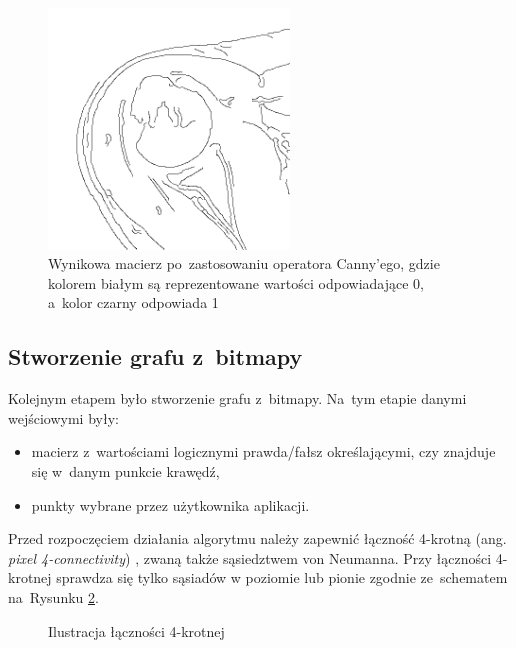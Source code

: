 \documentclass[a4paper,11pt,twoside,openright]{report}
\theoremstyle{definition}
\begin{document}
\begin{figure}[h!]
	\center
	\includegraphics[width=0.57\textwidth]{127}
	\caption{Wynikowa macierz po~zastosowaniu operatora Canny'ego, gdzie kolorem białym są
	reprezentowane wartości odpowiadające 0, a~kolor czarny odpowiada 1}
    	\label{fig:127}
\end{figure}

\subsection {Stworzenie grafu z~bitmapy}

Kolejnym etapem było stworzenie grafu z~bitmapy. Na~tym etapie danymi wejściowymi były:
\begin{itemize}[noitemsep]
\item macierz z~wartościami logicznymi prawda/fałsz określającymi, czy znajduje się w~danym
punkcie krawędź,
\item punkty wybrane przez użytkownika aplikacji.
\end{itemize}

Przed rozpoczęciem działania algorytmu należy zapewnić łączność 4-krotną
(ang. \textit{pixel 4-connectivity}) \cite{Pixel connectivity}, zwaną także
sąsiedztwem von Neumanna. Przy łączności 4-krotnej sprawdza się tylko sąsiadów
w poziomie lub pionie zgodnie ze~schematem na~Rysunku \ref{fig:4pixel}.

\begin{figure}[h!]
\begin{center}
\end{center}
\caption{Ilustracja łączności 4-krotnej}
\label{fig:4pixel}
\end{figure}
\end{document}
